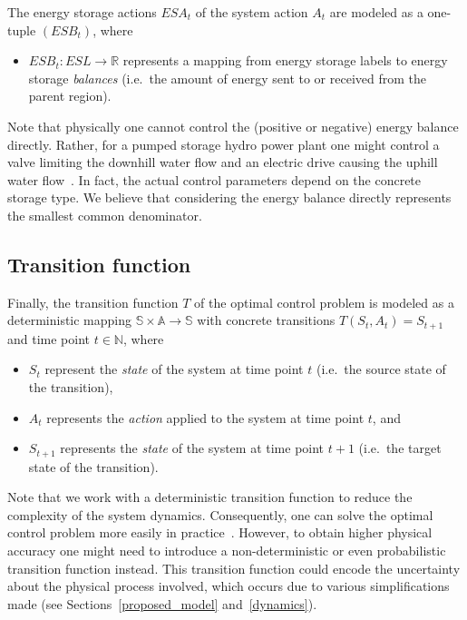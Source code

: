 The energy storage actions $ESA_t$ of the system action $A_t$ are modeled as a one-tuple $(ESB_t)$, where
\begin{itemize}
	\item $ESB_t: ESL \rightarrow \mathbb{R}$ represents a mapping from energy storage labels to energy storage \textit{balances} (i.e.\ the amount of energy sent to or received from the parent region).
\end{itemize}
Note that physically one cannot control the (positive or negative) energy balance directly. Rather, for a pumped storage hydro power plant one might control a valve limiting the downhill water flow and an electric drive causing the uphill water flow~\cite{Castronuovo2004}. In fact, the actual control parameters depend on the concrete storage type. We believe that considering the energy balance directly represents the smallest common denominator.

\subsection{Transition function}
\label{transitions}

Finally, the transition function $T$ of the optimal control problem is modeled as a deterministic mapping $\mathbb{S} \times \mathbb{A} \rightarrow \mathbb{S}$ with concrete transitions $T(S_t, A_t) = S_{t+1}$ and time point $t \in \mathbb{N}$, where
\begin{itemize}
	\item $S_t$ represent the \textit{state} of the system at time point $t$ (i.e.\ the source state of the transition),
	\item $A_t$ represents the \textit{action} applied to the system at time point $t$, and
	\item $S_{t+1}$ represents the \textit{state} of the system at time point $t+1$ (i.e.\ the target state of the transition).
\end{itemize}
Note that we work with a deterministic transition function to reduce the complexity of the system dynamics. Consequently, one can solve the optimal control problem more easily in practice~\cite{Bertsekas1995}. However, to obtain higher physical accuracy one might need to introduce a non-deterministic or even probabilistic transition function instead. This transition function could encode the uncertainty about the physical process involved, which occurs due to various simplifications made (see Sections~\ref{proposed_model} and~\ref{dynamics}).

